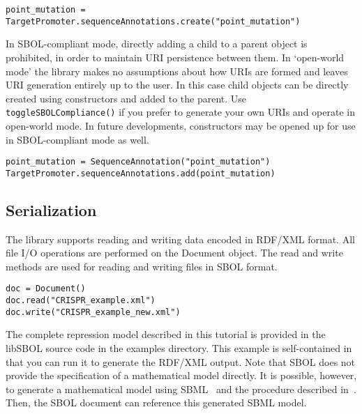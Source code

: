 \vspace{\abovedisplayskip}
\begin{minipage}{0.95\textwidth} 
\begin{lstlisting}
point_mutation = TargetPromoter.sequenceAnnotations.create("point_mutation")
\end{lstlisting}
\end{minipage}

In SBOL-compliant mode, directly adding a child to a parent object is prohibited, in order to maintain URI persistence between them. In `open-world mode' the library makes no assumptions about how URIs are formed and leaves URI generation entirely up to the user.  In this case child objects can be directly created using constructors and added to the parent. Use \lstinline+toggleSBOLCompliance()+ if you prefer to generate your own URIs and operate in open-world mode. In future developments, constructors may be opened up for use in SBOL-compliant mode as well.

\vspace{\abovedisplayskip}
\begin{minipage}{0.95\textwidth} 
\begin{lstlisting}
point_mutation = SequenceAnnotation("point_mutation")
TargetPromoter.sequenceAnnotations.add(point_mutation)
\end{lstlisting}
\end{minipage}

\subsection*{Serialization}
The library supports reading and writing data encoded in RDF/XML format. All file I/O operations are performed on the Document object. The read and write methods are used for reading and writing files in SBOL format.

\vspace{\abovedisplayskip}
\begin{minipage}{0.95\textwidth} 
\begin{lstlisting}
doc = Document()
doc.read("CRISPR_example.xml")
doc.write("CRISPR_example_new.xml")
\end{lstlisting}
\end{minipage}

The complete repression model described in this tutorial is provided in the libSBOL source code in the examples directory. This example is self-contained in that you can run it to generate the RDF/XML output. Note that SBOL does not provide the specification of a mathematical model directly. It is possible, however, to generate a mathematical model using SBML~\cite{SBML} and the procedure described in~\cite{roehner2015generating}. Then, the SBOL document can reference this generated SBML model.

